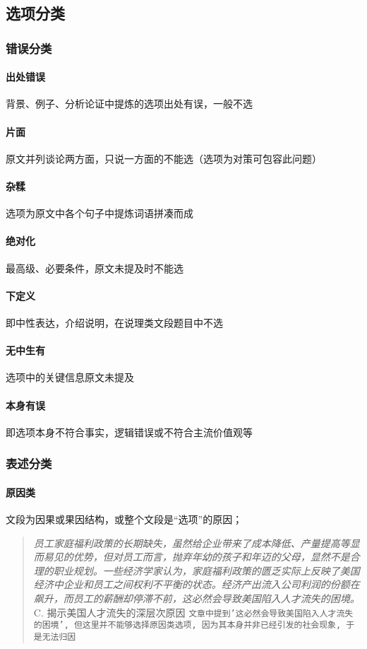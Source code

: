\subsection{选项分类}

\subsubsection{错误分类}

\paragraph{出处错误} 背景、例子、分析论证中提炼的选项出处有误，一般不选
\paragraph{片面}原文并列谈论两方面，只说一方面的不能选（选项为对策可包容此问题）
\paragraph{杂糅}选项为原文中各个句子中提炼词语拼凑而成
\paragraph{绝对化}最高级、必要条件，原文未提及时不能选
\paragraph{下定义}即中性表达，介绍说明，在说理类文段题目中不选
\paragraph{无中生有}选项中的关键信息原文未提及
\paragraph{本身有误}即选项本身不符合事实，逻辑错误或不符合主流价值观等

\subsubsection{表述分类}

\paragraph{原因类}
文段为因果或果因结构，或整个文段是“选项”的原因；
\begin{quote}
	\begin{tcolorbox}[colback=blue!5, colframe=blue!75!black, title=原因类选项案例]
		\textit{员工家庭福利政策的长期缺失，虽然给企业带来了成本降低、产量提高等显而易见的优势，但对员工而言，抛弃年幼的孩子和年迈的父母，显然不是合理的职业规划。一些经济学家认为，家庭福利政策的匮乏实际上反映了美国经济中企业和员工之间权利不平衡的状态。经济产出流入公司利润的份额在飙升，而员工的薪酬却停滞不前，这必然会导致美国陷入人才流失的困境。}\\
		C. 揭示美国人才流失的深层次原因
		\tcblower%
		\texttt{文章中提到'这必然会导致美国陷入人才流失的困境', 但这里并不能够选择原因类选项, 因为其本身并非已经引发的社会现象, 于是无法归因}
	\end{tcolorbox}
\end{quote}

